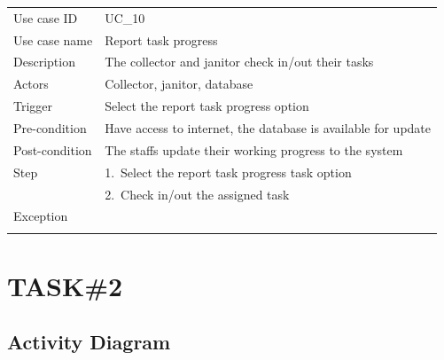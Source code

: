 \documentclass[a4paper, 13pt]{article}
\begin{document}
\begin{longtable}{|p{}|p{}|}
         Use case ID & UC\_10 \\
        Use case name & Report task progress \\
        Description & The collector and janitor check in/out their tasks\\
        Actors & Collector, janitor, database\\
        Trigger & Select the report task progress option\\
        Pre-condition & Have access to internet, the database is available for update\\
        Post-condition & The staffs update their working progress to the system\\
        Step & 1.~Select the report task progress task option\\
         & 2.~Check in/out the assigned task\\
        Exception & \\
        \rowcolor{moccasin} & & 
    \end{longtable} 
\newpage
\section    {TASK\#2}
\subsection{Activity Diagram}
\end{document}
